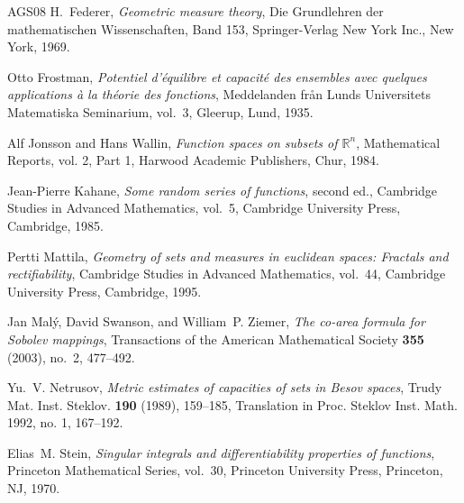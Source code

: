 \documentclass[11pt,reqno]{amsart}
\newcommand{\R}{\mathbb R}
\theoremstyle{definition}
\numberwithin{equation}{section}
\begin{document}
\begin{thebibliography}{AGS08}
H.~Federer, \emph{{Geometric measure theory}}, {Die Grundlehren der
  mathematischen Wissenschaften, Band 153}, Springer-Verlag New York Inc., New
  York, 1969. 

Otto Frostman, \emph{Potentiel d'\'{e}quilibre et capacit\'{e} des ensembles
  avec quelques applications \`{a} la th\'{e}orie des fonctions}, Meddelanden
  fr{\aa}n Lunds Universitets Matematiska Seminarium, vol.~3, Gleerup, Lund,
  1935.

Alf Jonsson and Hans Wallin, \emph{Function spaces on subsets of {$\R^n$}},
  Mathematical Reports, vol. 2, Part 1, Harwood Academic Publishers, Chur,
  1984.

Jean-Pierre Kahane, \emph{Some random series of functions}, second ed.,
  Cambridge Studies in Advanced Mathematics, vol.~5, Cambridge University
  Press, Cambridge, 1985. 

Pertti Mattila, \emph{Geometry of sets and measures in euclidean spaces:
  Fractals and rectifiability}, Cambridge Studies in Advanced Mathematics,
  vol.~44, Cambridge University Press, Cambridge, 1995.

Jan Mal\'{y}, David Swanson, and William~P. Ziemer, \emph{The co-area formula
  for {S}obolev mappings}, Transactions of the American Mathematical Society
  \textbf{355} (2003), no.~2, 477--492.

Yu.~V. Netrusov, \emph{Metric estimates of capacities of sets in {B}esov
  spaces}, Trudy Mat. Inst. Steklov. \textbf{190} (1989), 159--185, Translation
  in Proc. Steklov Inst. Math. 1992, no. 1, 167--192.

Elias~M. Stein, \emph{Singular integrals and differentiability properties of
  functions}, Princeton Mathematical Series, vol.~30, Princeton University
  Press, Princeton, NJ, 1970.

\end{thebibliography}

%
%
\end{document}
